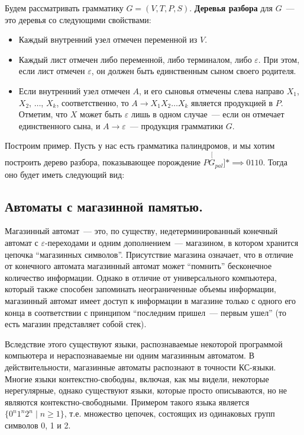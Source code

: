 \documentclass[a4paper,12pt]{article}
\begin{document}
	Будем рассматривать грамматику $G = (V, T, P, S)$. \textbf{Деревья разбора} для $G$~--- это деревья со следующими свойствами:
	\begin{itemize}
		\item Каждый внутренний узел отмечен переменной из $V$.
		\item Каждый лист отмечен либо переменной, либо терминалом, либо $\varepsilon$. При этом, если лист отмечен $\varepsilon$, он должен быть единственным сыном своего родителя.
		\item Если внутренний узел отмечен $A$, и его сыновья отмечены слева направо $X_1$, $X_2$, $\ldots$, $X_k$, соответственно, то $A \to X_1 X_2 \ldots X_k$ является продукцией в $P$. Отметим, что $X$ может быть $\varepsilon$ лишь в одном случае~--- если он отмечает единственного сына, и $A \to \varepsilon$~--- продукция грамматики $G$.
	\end{itemize}
	Построим пример. Пусть у нас есть грамматика палиндромов, и мы хотим построить дерево разбора, показывающее порождение $P \stackrel[G_{pal}]{*}{\implies} 0110$. Тогда оно будет иметь следующий вид:
	
	\subsection{Автоматы с магазинной памятью.}
	Магазинный автомат~--- это, по существу, недетерминированный конечный автомат с $\varepsilon$-переходами и одним дополнением~--- магазином, в котором хранится цепочка ``магазинных символов''. Присутствие магазина означает, что в отличие от конечного автомата магазинный автомат может ``помнить'' бесконечное количество информации. Однако в отличие от универсального компьютера, который также способен запоминать неограниченные объемы информации, магазинный автомат имеет доступ к информации в магазине только с одного его конца в соответствии с принципом ``последним пришел~--- первым ушел'' (то есть магазин представляет собой стек).

	Вследствие этого существуют языки, распознаваемые некоторой программой компьютера и нераспознаваемые ни одним магазинным автоматом. В действительности, магазинные автоматы распознают в точности КС-языки. Многие языки контекстно-свободны, включая, как мы видели, некоторые нерегулярные, однако существуют языки, которые просто описываются, но не являются контекстно-свободными.  Примером такого языка является $\{0^n1^n2^n \mid n \geqslant 1\}$, т.е. множество цепочек, состоящих из одинаковых групп символов 0, 1 и 2.
	
\end{document}
